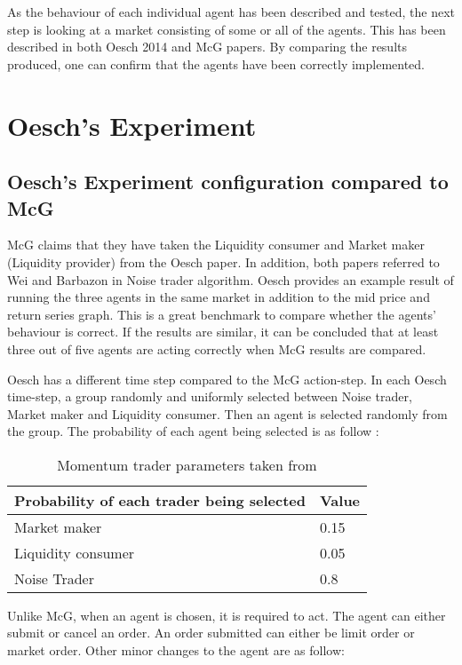 As the behaviour of each individual agent has been described and tested, the next step is looking at a market consisting of some or all of the agents. This has been described in both Oesch 2014 \cite{Oesch} and McG \cite{McGroarty} papers. By comparing the results produced, one can confirm that the agents have been correctly implemented. 

\section{Oesch's Experiment}
\subsection{Oesch's Experiment configuration compared to McG}
McG claims that they have taken the Liquidity consumer and Market maker (Liquidity provider) from the Oesch paper. In addition, both papers referred to Wei and Barbazon \cite{CuiNoise} in Noise trader algorithm. Oesch provides an example result of running the three agents in the same market in addition to the mid price and return series graph. This is a great benchmark to compare whether the agents' behaviour is correct. If the results are similar, it can be concluded that at least three out of five agents are acting correctly when McG results are compared. 

Oesch has a different time step compared to the McG action-step. In each Oesch time-step, a group randomly and uniformly selected between Noise trader, Market maker and Liquidity consumer. Then an agent is selected randomly from the group. The probability of each agent being selected is as follow : 

\begin{table}[h]
\centering
\begin{tabular}{ |m||p{4cm}|} 
\hline
\textbf{Probability of each trader being selected}& \textbf{Value} \\
\hline
\hline
Market maker & 0.15 \\ 
\hline
Liquidity consumer & 0.05\\ 
\hline
Noise Trader & 0.8 \\ 
\hline
\end{tabular}
\caption{Momentum trader parameters taken from \cite{McGroarty}} 
\end{table}
\FloatBarrier 

Unlike McG, when an agent is chosen, it is required to act. The agent can either submit or cancel an order. An order submitted can either be limit order or market order. Other minor changes to the agent are as follow: 

